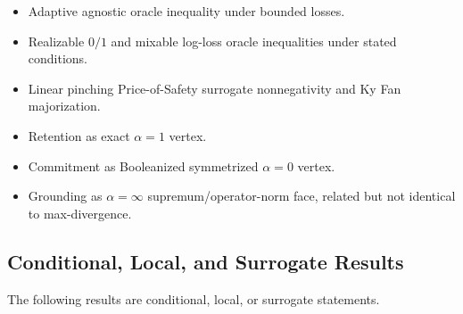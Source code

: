 \documentclass[12pt]{article}
\theoremstyle{definition}
\begin{document}
\begin{itemize}[leftmargin=1.6em]
\item Adaptive agnostic oracle inequality under bounded losses.
\item Realizable $0/1$ and mixable log-loss oracle inequalities under stated
conditions.
\item Linear pinching Price-of-Safety surrogate nonnegativity and Ky Fan
majorization.
\item Retention as exact $\alpha=1$ vertex.
\item Commitment as Booleanized symmetrized $\alpha=0$ vertex.
\item Grounding as $\alpha=\infty$ supremum/operator-norm face, related but
not identical to max-divergence.
\end{itemize}

\subsection{Conditional, Local, and Surrogate Results}
\label{subsec:conditional-results}

The following results are conditional, local, or surrogate statements.
\end{document}
